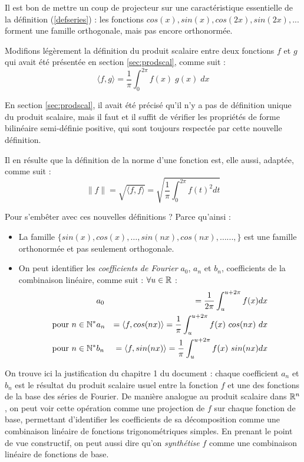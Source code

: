 Il est bon de mettre un coup de projecteur sur une caractéristique
essentielle de la définition (\ref{defseries}) : les fonctions
${cos(x), sin(x), cos(2x), sin(2x),...}$ forment une famille orthogonale, mais pas encore orthonormée.


Modifions légèrement la définition du produit scalaire entre deux fonctions $f$ et $g$ qui avait été présentée en section \ref{sec:prodscal}, comme suit :
\begin{equation}
\langle f, g \rangle  = \frac{1}{\pi}\int_0^{2\pi} f(x)\; g(x)\; dx
\end{equation}

En section \ref{sec:prodscal}, il avait été précisé qu'il n'y a pas de définition unique du produit scalaire, mais il faut et il suffit de vérifier les propriétés de forme bilinéaire semi-définie positive, qui sont toujours respectée par cette nouvelle définition. 

Il en résulte que la définition de la norme d'une fonction est, elle aussi, adaptée, comme suit :
\begin{equation}
\|f\|= \sqrt{\langle f, f \rangle}= \sqrt{ \frac{1}{\pi}\int_0^{2\pi} f(t)^2dt}
\end{equation} 

Pour s'embêter avec ces nouvelles définitions ? Parce qu'ainsi :
\begin{itemize}
  \item La famille $\{sin(x),cos(x),\dots,sin(nx),cos(nx),\dots...,\}$ est une famille orthonormée et pas seulement orthogonale.
  \item On peut identifier les \emph{coefficients de Fourier} $a_0$, $a_n$ et
 $b_n$, coefficients de la combinaison linéaire, comme suit :
 $\forall u\in \mathbb{R}$ :
\begin{eqnarray}
& a_0 & =\frac{1}{2\pi}\int_{u}^{u+2\pi}f(x)dx \label{a0}\\
\text{pour} ~ n\in \mathbb{N}^* & a_n & = \langle f, cos(nx) \rangle = \frac{1}{\pi}\int_{u}^{u+2\pi}f(x)~ cos(nx)~ dx  \label{an}\\
\text{pour} ~ n\in \mathbb{N}^* & b_n & = \langle f, sin(nx) \rangle= \frac{1}{\pi}\int_{u}^{u+2\pi}f(x)~ sin(nx) dx  \label{bn}
\end{eqnarray}
  \end{itemize}


On trouve ici la justification du chapitre 1 du document : chaque coefficient $a_n$ et $b_n$ est le résultat du produit
  scalaire usuel entre la fonction $f$ et une des fonctions de la base des
  séries de Fourier. De manière analogue au produit scalaire dans
  $\mathbb{R}^n$, on peut voir cette opération comme une projection de $f$
  sur chaque fonction de base, permettant d'identifier les
  coefficients de sa décomposition comme une combinaison linéaire de
  fonctions trigonométriques simples. En prenant le point de vue
  constructif, on peut aussi dire qu'on \emph{synthétise}  $f$ comme une combinaison linéaire de fonctions de base.


